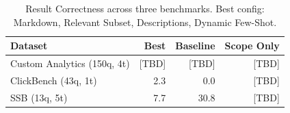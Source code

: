 \begin{table}[t]
\centering
\caption{Result Correctness across three benchmarks. Best config: Markdown, Relevant Subset, Descriptions, Dynamic Few-Shot.}
\label{tab:cross_dataset}
\small
\begin{tabular}{lrrr}
\toprule
Dataset & Best & Baseline & Scope Only \\
\midrule
Custom Analytics (150q, 4t) & [TBD] & [TBD] & [TBD] \\
ClickBench (43q, 1t) & 2.3 & 0.0 & [TBD] \\
SSB (13q, 5t) & 7.7 & 30.8 & [TBD] \\
\bottomrule
\end{tabular}
\end{table}